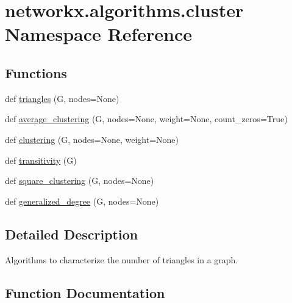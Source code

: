 \hypertarget{namespacenetworkx_1_1algorithms_1_1cluster}{}\section{networkx.\+algorithms.\+cluster Namespace Reference}
\label{namespacenetworkx_1_1algorithms_1_1cluster}
\subsection*{Functions}
\begin{DoxyCompactItemize}
\item 
def \hyperlink{namespacenetworkx_1_1algorithms_1_1cluster_a945fd7d36335c0f46a2ec05abccd30fb}{triangles} (G, nodes=None)
\item 
def \hyperlink{namespacenetworkx_1_1algorithms_1_1cluster_a10ca2358e4d9e744b1b845ab42736514}{average\+\_\+clustering} (G, nodes=None, weight=None, count\+\_\+zeros=True)
\item 
def \hyperlink{namespacenetworkx_1_1algorithms_1_1cluster_a704bbfd8fc33040ff3cc5234c1b5e059}{clustering} (G, nodes=None, weight=None)
\item 
def \hyperlink{namespacenetworkx_1_1algorithms_1_1cluster_a364c2a90c8b1ce724099dfdd8bf20c66}{transitivity} (G)
\item 
def \hyperlink{namespacenetworkx_1_1algorithms_1_1cluster_a5f995bd21e2f8307be5d151c494ac4b8}{square\+\_\+clustering} (G, nodes=None)
\item 
def \hyperlink{namespacenetworkx_1_1algorithms_1_1cluster_a51b9017a248ec56d2af902b4a05e0046}{generalized\+\_\+degree} (G, nodes=None)
\end{DoxyCompactItemize}


\subsection{Detailed Description}
\begin{DoxyVerb}Algorithms to characterize the number of triangles in a graph.\end{DoxyVerb}
 

\subsection{Function Documentation}
\mbox{\label{namespacenetworkx_1_1algorithms_1_1cluster_a10ca2358e4d9e744b1b845ab42736514}} 
